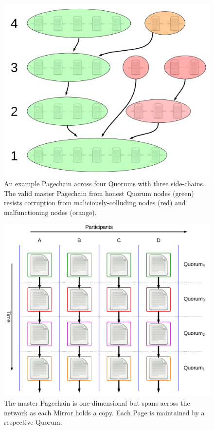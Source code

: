 \documentclass{sig-alternate}
\begin{document}
\begin{figure}[h]
	\centering
	\includegraphics[width=0.9\linewidth]{../images/LucidCharts/Page-chain2.pdf}
	\caption{An example Pagechain across four Quorums with three side-chains. The valid master Pagechain from honest Quorum nodes (green) resists corruption from maliciously-colluding nodes (red) and malfunctioning nodes (orange).}
	\label{fig:sideChains}
\end{figure}

\begin{figure}[h!]
	\centering
	\includegraphics[width=\linewidth]{../images/LucidCharts/Data-Structure-Overview.pdf}
	\caption{The master Pagechain is one-dimensional but spans across the network as each Mirror holds a copy. Each Page is maintained by a respective Quorum.}
\end{figure}
\end{document}
